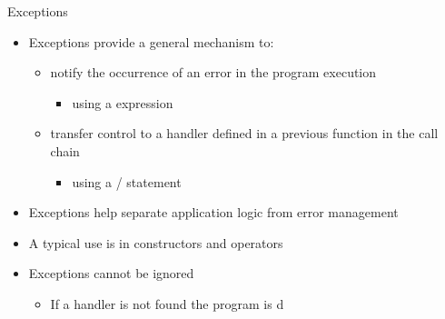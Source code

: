 \begin{frame}[fragile]{Exceptions}

  \begin{itemize}
  \item Exceptions provide a general mechanism to:
    \begin{itemize}
    \item notify the occurrence of an error in the program execution
      \begin{itemize}
      \item using a  expression
      \end{itemize}
    \item transfer control to a handler defined in a previous function in the call
      chain
      \begin{itemize}
      \item using a / statement
      \end{itemize}
    \end{itemize}
  \item<2-> Exceptions help separate application logic from error management
  \item<3-> A typical use is in constructors and operators
  \item<4-> Exceptions cannot be ignored
    \begin{itemize}
    \item If a handler is not found the program is d
    \end{itemize}
  \end{itemize}

\end{frame}

